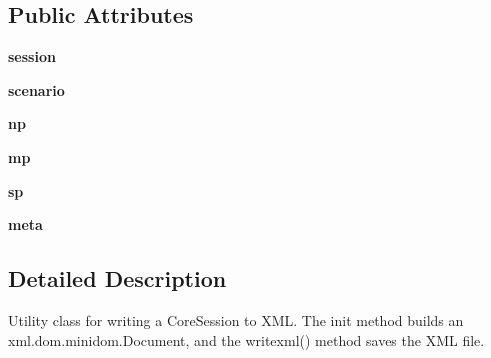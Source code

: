 \subsection*{Public Attributes}
\begin{DoxyCompactItemize}
\item 
\hypertarget{classcore_1_1misc_1_1xmlwriter0_1_1_core_document_writer0_a0a0c745593dac363c5a54a7dafdea3c1}{{\bfseries session}}\label{classcore_1_1misc_1_1xmlwriter0_1_1_core_document_writer0_a0a0c745593dac363c5a54a7dafdea3c1}

\item 
\hypertarget{classcore_1_1misc_1_1xmlwriter0_1_1_core_document_writer0_a4aaffefb7ea8bf25045f4123bfab6028}{{\bfseries scenario}}\label{classcore_1_1misc_1_1xmlwriter0_1_1_core_document_writer0_a4aaffefb7ea8bf25045f4123bfab6028}

\item 
\hypertarget{classcore_1_1misc_1_1xmlwriter0_1_1_core_document_writer0_a6a2e9ab556b2059c90d8bbf331c2c5a7}{{\bfseries np}}\label{classcore_1_1misc_1_1xmlwriter0_1_1_core_document_writer0_a6a2e9ab556b2059c90d8bbf331c2c5a7}

\item 
\hypertarget{classcore_1_1misc_1_1xmlwriter0_1_1_core_document_writer0_af846564239720f9137853dea43cc1ba3}{{\bfseries mp}}\label{classcore_1_1misc_1_1xmlwriter0_1_1_core_document_writer0_af846564239720f9137853dea43cc1ba3}

\item 
\hypertarget{classcore_1_1misc_1_1xmlwriter0_1_1_core_document_writer0_ab9b7cc1064ee64c32f4d537a0e4991ae}{{\bfseries sp}}\label{classcore_1_1misc_1_1xmlwriter0_1_1_core_document_writer0_ab9b7cc1064ee64c32f4d537a0e4991ae}

\item 
\hypertarget{classcore_1_1misc_1_1xmlwriter0_1_1_core_document_writer0_a5e1091c4956bb4c2ad0f23ddc5d3dbfe}{{\bfseries meta}}\label{classcore_1_1misc_1_1xmlwriter0_1_1_core_document_writer0_a5e1091c4956bb4c2ad0f23ddc5d3dbfe}

\end{DoxyCompactItemize}


\subsection{Detailed Description}
\begin{DoxyVerb}Utility class for writing a CoreSession to XML. The init method builds
an xml.dom.minidom.Document, and the writexml() method saves the XML file.
\end{DoxyVerb}
 

